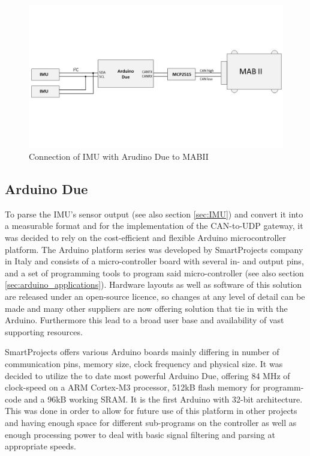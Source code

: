 \documentclass[ExampleMasters.tex]{subfiles}
\begin{document}
\begin{figure}[h]
\centering
\includegraphics[width=1\linewidth]{figures/IMU_overview}
\caption{Connection of IMU with Arudino Due to MABII}

\label{fig:IMU_overview}
\end{figure}



\subsection{Arduino Due}
\label{sec:arduino}

To parse the IMU's sensor output (see also section \ref{sec:IMU}) and convert it into a measurable format and for the implementation of the CAN-to-UDP gateway, it was decided to rely on the cost-efficient and flexible Arduino microcontroller platform. The Arduino platform series was developed by  SmartProjects company in Italy and consists of a micro-controller board with several in- and output pins, and a set of programming tools to program said micro-controller (see also section \ref{sec:arduino_applications}). Hardware layouts as well as software of this solution are released under an open-source licence, so changes at any level of detail can be made and many other suppliers are now offering solution that tie in with the Arduino. Furthermore this lead to a broad user base and availability of vast supporting resources.

SmartProjects offers various Arduino boards mainly differing in number of communication pins, memory size, clock frequency and physical size. It was decided to utilize the to date most powerful Arduino Due, offering 84 MHz of clock-speed on a ARM Cortex-M3 processor, 512kB flash memory for programm-code and a 96kB working SRAM. It is the first Arduino with 32-bit architecture. This was done in order to allow for future use of this platform in other projects and having enough space for different sub-programs on the controller as well as enough processing power to deal with basic signal filtering and parsing at appropriate speeds. 
\end{document}
